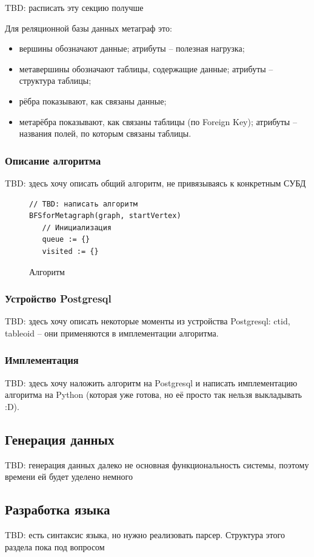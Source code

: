 TBD: расписать эту секцию получше

Для реляционной базы данных метаграф это:
\begin{itemize}
  \item вершины обозначают данные; атрибуты -- полезная нагрузка;
  \item метавершины обозначают таблицы, содержащие данные; атрибуты -- структура таблицы;
  \item рёбра показывают, как связаны данные;
  \item метарёбра показывают, как связаны таблицы (по Foreign Key); атрибуты -- названия полей, по которым связаны таблицы.
\end{itemize}

\subsubsection{Описание алгоритма}
TBD: здесь хочу описать общий алгоритм, не привязываясь к конкретным СУБД

\begin{figure}
  \fontsize{12pt}{14pt}\selectfont
  \begin{lstlisting}
// TBD: написать алгоритм
BFSforMetagraph(graph, startVertex)
   // Инициализация
   queue := {}
   visited := {}
  \end{lstlisting}
  \caption{Алгоритм }
\end{figure}

\subsubsection{Устройство Postgresql}
TBD: здесь хочу описать некоторые моменты из устройства Postgresql: ctid, tableoid -- они применяются в имплементации алгоритма.

\subsubsection{Имплементация}
TBD: здесь хочу наложить алгоритм на Postgresql и написать имплементацию алгоритма на Python (которая уже готова, но её просто так нельзя выкладывать :D).

\subsection{Генерация данных}
TBD: генерация данных далеко не основная функциональность системы, поэтому времени ей будет уделено немного

\subsection{Разработка языка}
TBD: есть синтаксис языка, но нужно реализовать парсер. Структура этого раздела пока под вопросом

